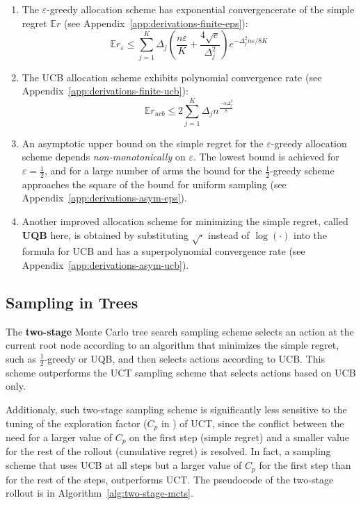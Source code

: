 \documentclass{article}
\newcommand {\IE} {\ensuremath {\mathbb{E}}}
\begin{document}
\begin{enumerate}
\item The $\varepsilon$-greedy allocation scheme has exponential convergencerate of the simple regret $\IE r$ (see Appendix~\ref{app:derivations-finite-eps}):
\begin{equation}
  \IE r_\varepsilon\le\sum_{j=1}^K\Delta_j\left(\frac {n\varepsilon} K + \frac {4\sqrt e}
{\Delta_j^2}\right)e^{-\Delta_j^2n\varepsilon/8K}
\end{equation}
\item The UCB allocation scheme exhibits polynomial convergence
rate (see Appendix~\ref{app:derivations-finite-ucb}):
\begin{equation}
\IE r_{ucb} \le 2\sum_{j=1}^K \Delta_jn^{\frac {-\alpha \Delta_j^2} 8}
\end{equation}
\item An asymptotic upper bound on the simple regret for the
$\varepsilon$-greedy allocation scheme depends \emph{non-monotonically} on
$\varepsilon$. The lowest bound is achieved for $\varepsilon=\frac 1
2$, and for a large number of arms the bound for the $\frac 1
2$-greedy scheme approaches the square of the bound for uniform
sampling (see Appendix~\ref{app:derivations-asym-eps}).

\item Another improved allocation scheme for minimizing the simple regret,
called \textbf{UQB} here, is obtained by substituting $\sqrt{\cdot}$
instead of $\log(\cdot)$ into the formula for UCB and has a
superpolynomial convergence rate (see
Appendix~\ref{app:derivations-asym-ucb}).
\end{enumerate}

\subsection{Sampling in Trees}
\label{sec:sampling-in-trees}

The {\bf two-stage} Monte Carlo tree search sampling
scheme selects an action at the current root node according to an
algorithm that minimizes the simple regret, such as $\frac 1 2$-greedy or
UQB, and then selects actions according to UCB. This scheme
outperforms the UCT sampling scheme that selects actions based on
UCB only.

Additionaly, such two-stage sampling scheme is significantly less
sensitive to the tuning of the exploration factor ($C_p$ in
\cite{Kocsis.uct}) of UCT, since the conflict \cite{Bubeck.pure}
between the need for a larger value of $C_p$ on the first step (simple
regret) and a smaller value for the rest of the rollout (cumulative
regret) is resolved. In fact, a sampling scheme that uses UCB at all
steps but a larger value of $C_p$ for the first step than for the rest
of the steps, outperforms UCT. The pseudocode of the two-stage rollout
is in Algorithm~\ref{alg:two-stage-mcts}.
\end{document}
